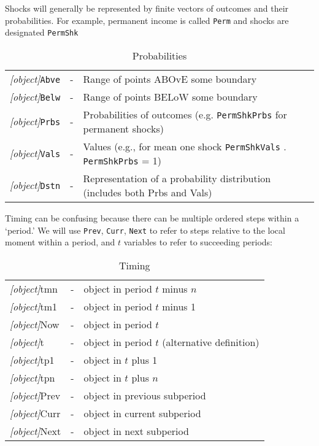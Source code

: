 \documentclass[12pt]{econtex}
\begin{document}
Shocks will generally be represented by finite vectors of outcomes and their probabilities.  For example, permanent income is called \texttt{Perm} and shocks are designated \texttt{PermShk}
\begin{table}[ht]
	\centering
	\begin{tabular}{|>{\ttfamily}ccl|} 		
		\hline
   \textit{[object]}\texttt{Abve} & - & Range of points ABOvE some boundary
\\ \textit{[object]}\texttt{Belw} & - & Range of points BELoW some boundary
\\ \textit{[object]}\texttt{Prbs} & - & Probabilities of outcomes (e.g. \texttt{PermShkPrbs} for permanent shocks) 
\\ \textit{[object]}\texttt{Vals} & - & Values (e.g., for mean one shock \texttt{PermShkVals} . \texttt{PermShkPrbs} = 1) 
\\ \textit{[object]}\texttt{Dstn} & - & Representation of a probability distribution (includes both Prbs and Vals)
\\ 	\hline
	\end{tabular}
	\caption{Probabilities}
	\label{table:Probabilities}
\end{table}	

Timing can be confusing because there can be multiple ordered steps 
within a `period.'  We will use \texttt{Prev}, \texttt{Curr}, \texttt{Next} to refer
to steps relative to the local moment within a period, and $t$ variables to refer to succeeding periods:
\begin{table}[ht]
	\centering 
	\begin{tabular}{|>{\ttfamily}lcl|} 		
		\hline
   \textit{[object]}tmn & - & object in period $t$ minus $n$
\\ \textit{[object]}tm1 & - & object in period $t$ minus 1 
\\ \textit{[object]}Now & - & object in period $t$
\\ \textit{[object]}t\phantom{p1}   & - & object in period $t$ (alternative definition)
\\ \textit{[object]}tp1 & - & object in $t$ plus 1 
\\ \textit{[object]}tpn & - & object in $t$ plus $n$ 
\\ \textit{[object]}Prev & - & object in previous subperiod
\\ \textit{[object]}Curr & - & object in current subperiod
\\ \textit{[object]}Next & - & object in next subperiod
\\	\hline
	\end{tabular}
	\caption{Timing}
	\label{table:Timing}
\end{table}	
\end{document}
